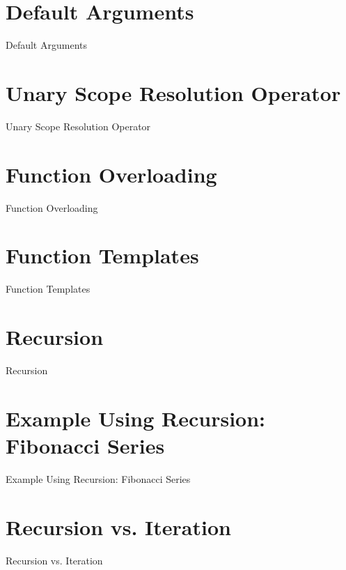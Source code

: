 \documentclass[10pt]{beamer}
\begin{document}
\section{Default Arguments}
\begin{frame}{Default Arguments}
	\lipsum[2]
\end{frame}

\section{Unary Scope Resolution Operator}
\begin{frame}{Unary Scope Resolution Operator}
	\lipsum[2]
\end{frame}

\section{Function Overloading}
\begin{frame}{Function Overloading}
	\lipsum[2]
\end{frame}

\section{Function Templates}
\begin{frame}{Function Templates}
	\lipsum[2]
\end{frame}

\section{Recursion}
\begin{frame}{Recursion}
	\lipsum[2]
\end{frame}

\section{Example Using Recursion: Fibonacci Series}
\begin{frame}{Example Using Recursion: Fibonacci Series}
	\lipsum[2]
\end{frame}

\section{Recursion vs. Iteration}
\begin{frame}{Recursion vs. Iteration}
	\lipsum[2]
\end{frame}
\end{document}
